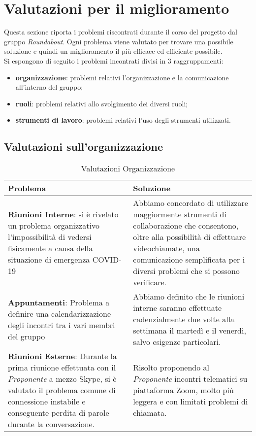 \section{Valutazioni per il miglioramento}
	Questa sezione riporta i problemi riscontrati durante il corso del progetto dal gruppo \textit{Roundabout}. Ogni problema viene valutato per trovare una possibile soluzione e quindi un miglioramento il più efficace ed efficiente possibile. \\
	Si espongono di seguito i problemi incontrati divisi in 3 raggruppamenti:
	\begin{itemize}
		\item \textbf{organizzazione}: problemi relativi l’organizzazione e la comunicazione all’interno del gruppo;
		\item \textbf{ruoli}: problemi relativi allo svolgimento dei diversi ruoli;
		\item \textbf{strumenti di lavoro}: problemi relativi l’uso degli strumenti utilizzati.
	\end{itemize}

\subsection{Valutazioni sull'organizzazione}
	\begin{longtable}{ 
		>{\centering}p{} 
		>{\centering\arraybackslash}p{}}
	
		\caption {Valutazioni Organizzazione}		\\
		
		\textbf{\color{white}Problema} &
		\textbf{\color{white}Soluzione}
		\tabularnewline  
		\endhead
		
		\textbf{Riunioni Interne}: si è rivelato un problema organizzativo l'impossibilità di vedersi fisicamente a causa della situazione di emergenza COVID-19 & Abbiamo concordato di utilizzare maggiormente strumenti di collaborazione che consentono, oltre alla possibilità di effettuare videochiamate, una comunicazione semplificata per i diversi problemi che si possono verificare. \\
		
		\textbf{Appuntamenti}: Problema a definire una calendarizzazione degli incontri tra i vari membri del gruppo & Abbiamo definito che le riunioni interne saranno effettuate cadenzialmente due volte alla settimana il martedì e il venerdì, salvo esigenze particolari.\\
		
		\textbf{Riunioni Esterne}: Durante la prima riunione effettuata con il \textit{Proponente} a mezzo Skype, si è valutato il problema comune di connessione instabile e conseguente perdita di parole durante la conversazione. & Risolto proponendo al \textit{Proponente}	incontri telematici su piattaforma Zoom, molto più leggera e con limitati problemi di chiamata.\\
				
		\end{longtable}

